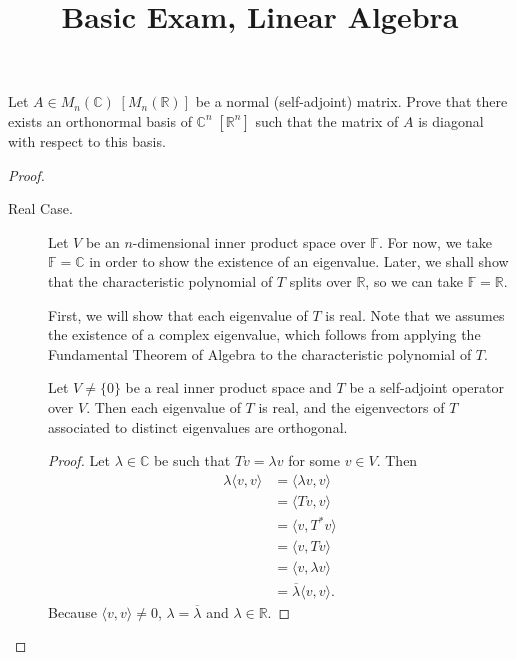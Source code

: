 \documentclass{article}
\title{Basic Exam, Linear Algebra}
\begin{document}
\maketitle

\begin{problem}
Let \(A\in M_n(\mathbb{C})\;[M_n(\mathbb{R})]\) be a normal (self-adjoint)
matrix. Prove that there exists an orthonormal basis of \(\mathbb{C}^n\;
[\mathbb{R}^n]\) such that the matrix of \(A\) is diagonal with respect to this
basis.
\end{problem}

\begin{proof}\leavevmode
	\begin{description}
		\item[Real Case.] Let \(V\) be an \(n\)-dimensional inner product space
			over \(\mathbb{F}\).  For now, we take \(\mathbb{F} = \mathbb{C}\) in
			order to show the existence of an eigenvalue.  Later, we shall show that
			the characteristic polynomial of \(T\) splits over \(\mathbb{R}\), so we
			can take \(\mathbb{F} = \mathbb{R}\).

			First, we will show that each eigenvalue of \(T\) is real.  Note that we
			assumes the existence of a complex eigenvalue, which follows from
			applying the Fundamental Theorem of Algebra to the characteristic
			polynomial of \(T\).
			\begin{lemma}\label{lem:real_eigenvalue}
				Let \(V \neq \{0\}\) be a real inner product space and \(T\) be a
				self-adjoint operator over \(V\).  Then each eigenvalue of \(T\) is
				real, and the eigenvectors of \(T\) associated to distinct eigenvalues
				are orthogonal.
			\end{lemma}
			\begin{proof}
				Let \(\lambda\in \mathbb{C}\) be such that \(T v = \lambda v\) for some
				\(v\in V\).  Then
				\begin{align*}
					\lambda\langle v, v \rangle & = \langle \lambda v, v \rangle            \\
					                            & = \langle T v , v \rangle                 \\
					                            & = \langle v, T^* v \rangle                \\
					                            & = \langle v, T v \rangle                  \\
					                            & = \langle v, \lambda v \rangle            \\
					                            & = \overline{\lambda} \langle v, v \rangle
					.\end{align*}
				Because \(\langle v, v\rangle\neq 0\), \(\lambda = \overline{\lambda}\)
				and \(\lambda\in \mathbb{R}\).


\end{proof}
\end{description}
\end{proof}
\end{document}
